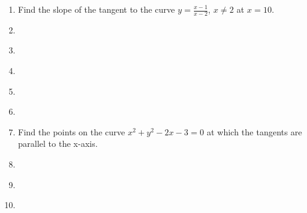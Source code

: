 \begin{enumerate}[label=\thesection.\arabic*,ref=\thesection.\theenumi]
\item Find the slope of the tangent to the curve $y = \frac{x-1}{x-2}$, $x \neq 2$ at $x=10$.
	\\
\solution 
\label{chapters/12/6/3/2}

\item 
\label{chapters/12/6/3/8}

\item 
\label{chapters/12/6/3/10}

\item 
\label{chapters/12/6/3/11}

\item 
\label{chapters/12/6/3/13}

\item 
\label{chapters/12/6/3/15}

\item Find the points on the curve $x^2+y^2-2x-3=0$ at which the tangents are parallel to the x-axis.
\label{chapters/12/6/3/19}

\item 
\item 
\label{chapters/12/6/3/25}

\item 
\label{chapters/12/6/3/27}


\end{enumerate}

